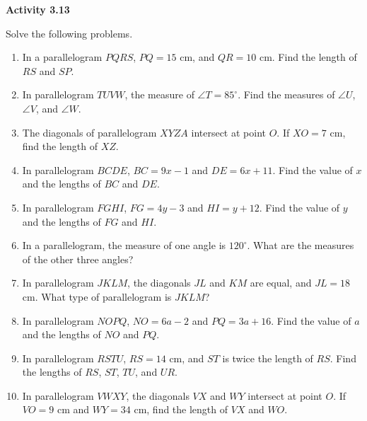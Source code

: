 \vspace{0.3ex}
\noindent\textbf{Activity 3.13}

\vspace{0.2ex}

Solve the following problems.

\begin{enumerate}
    \item In a parallelogram \(PQRS\), \(PQ = 15\) cm, and \(QR = 10\) cm. Find the length of \(RS\) and \(SP\).
    \item In parallelogram \(TUVW\), the measure of \(\angle T = 85^\circ\). Find the measures of \(\angle U\), \(\angle V\), and \(\angle W\).
    \item The diagonals of parallelogram \(XYZA\) intersect at point \(O\). If \(XO = 7\) cm, find the length of \(XZ\).
    \item In parallelogram \(BCDE\), \(BC = 9x - 1\) and \(DE = 6x + 11\). Find the value of \(x\) and the lengths of \(BC\) and \(DE\).
    \item In parallelogram \(FGHI\), \(FG = 4y - 3\) and \(HI = y + 12\). Find the value of \(y\) and the lengths of \(FG\) and \(HI\).
    \item In a parallelogram, the measure of one angle is \(120^\circ\). What are the measures of the other three angles?
    \item In parallelogram \(JKLM\), the diagonals \(JL\) and \(KM\) are equal, and \(JL = 18\) cm. What type of parallelogram is \(JKLM\)?
    \item In parallelogram \(NOPQ\), \(NO = 6a - 2\) and \(PQ = 3a + 16\). Find the value of \(a\) and the lengths of \(NO\) and \(PQ\).
    \item In parallelogram \(RSTU\), \(RS = 14\) cm, and \(ST\) is twice the length of \(RS\). Find the lengths of \(RS\), \(ST\), \(TU\), and \(UR\).
    \item In parallelogram \(VWXY\), the diagonals \(VX\) and \(WY\) intersect at point \(O\). If \(VO = 9\) cm and \(WY = 34\) cm, find the length of \(VX\) and \(WO\).
\end{enumerate}
